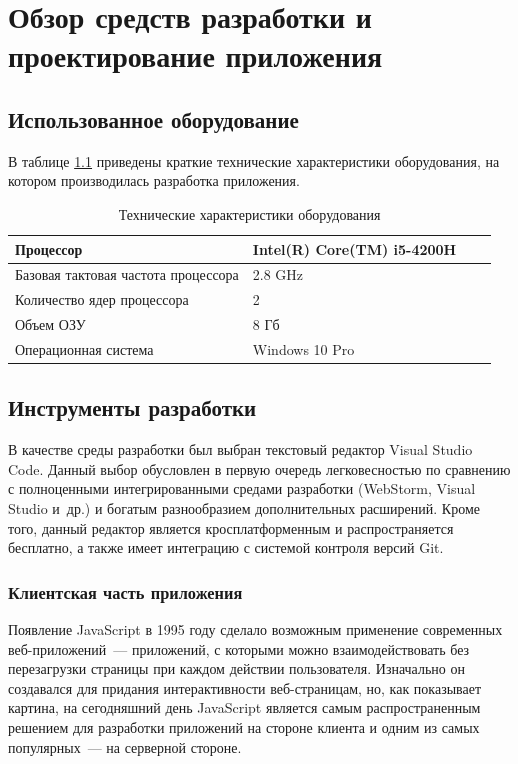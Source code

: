\chapter{Обзор средств разработки и проектирование приложения}
\label{cha:design}

\section{Использованное оборудование}
В таблице \ref{tab:tab1} приведены краткие технические характеристики оборудования, на котором производилась разработка приложения.

\begin{table}
	\centering
	\begin{tabular}{ |l|l|c|c| } 
		\hline
		Процессор & Intel(R) Core(TM) i5-4200H \\
		\hline
		Базовая тактовая частота процессора & 2.8 GHz \\
		\hline
		Количество ядер процессора & 2 \\
		\hline
		Объем ОЗУ & 8 Гб \\
		\hline
		Операционная система & Windows 10 Pro \\ 
		\hline
	\end{tabular}
	\caption{Технические характеристики оборудования}
	\label{tab:tab1}
\end{table}

\section{Инструменты разработки}

В качестве среды разработки был выбран текстовый редактор Visual Studio Code. Данный выбор обусловлен в первую очередь легковесностью по сравнению с полноценными интегрированными средами разработки (WebStorm, Visual Studio и~др.) и богатым разнообразием дополнительных расширений. Кроме того, данный редактор является кросплатформенным и распространяется бесплатно, а также имеет интеграцию с системой контроля версий Git.

\subsection{Клиентская часть приложения}

Появление JavaScript в 1995 году сделало возможным применение современных веб-приложений~--- приложений, с которыми можно взаимодействовать без перезагрузки страницы при каждом действии пользователя. Изначально он создавался для придания интерактивности веб-страницам, но, как показывает картина, на сегодняшний день JavaScript является самым распространенным решением для разработки приложений на стороне клиента и одним из самых популярных~--- на серверной стороне.

